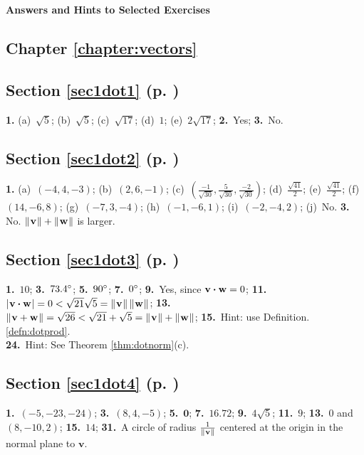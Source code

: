 \textsf{\textbf{\Large Answers and Hints to Selected Exercises}}
\begin{multicols}{2}
\section*{Chapter \ref{chapter:vectors}}
\subsection*{Section \ref{sec1dot1} (p. \pageref{sec1dot1})}
\textbf{1.} 
(a)~$\sqrt{5}$; \quad 
(b)~$\sqrt{5}$; \quad 
(c)~$\sqrt{17}$; \quad 
(d)~$1$;\quad
(e)~$2 \sqrt{17}$; \quad 
\textbf{2.}~Yes; \quad 
\textbf{3.}~No.
\subsection*{Section \ref{sec1dot2} (p. \pageref{sec1dot2})}
\textbf{1.} 
(a)~$(-4,4,-3)$; \quad 
(b)~$(2,6,-1)$;\quad
(c)~$\left ( \frac{-1}{\sqrt{30}},\frac{5}{\sqrt{30}},
\frac{-2}{\sqrt{30}}\right )$; \quad 
(d)~$\frac{\sqrt{41}}{2}$; \quad 
(e)~$\frac{\sqrt{41}}{2}$;\quad
(f)~$(14,-6,8)$; \quad
(g)~$(-7,3,-4)$; \quad
(h)~$(-1,-6,1)$; \quad 
(i)~$(-2,-4,2)$; \quad 
(j)~No.\quad
\textbf{3.} No. $\lVert\mspace{1mu}\textbf{v}\mspace{1mu}\rVert +
\lVert\mspace{1mu}\textbf{w}\mspace{1mu}\rVert$ is larger.

\subsection*{Section \ref{sec1dot3} (p. \pageref{sec1dot3})}
\textbf{1.}~$10$; \quad 
\textbf{3.}~$73.4^\circ$; \quad 
\textbf{5.}~$90^\circ$; \quad 
\textbf{7.}~$0^\circ$;\quad
\textbf{9.}~Yes, since $\textbf{v} \bm{\cdot} \textbf{w} = 0$;
\textbf{11.}~$\lvert\mspace{1mu}\textbf{v} \bm{\cdot} \textbf{w}\mspace{1mu}\rvert =
0 < \sqrt{21}\sqrt{5} = \lVert\mspace{1mu}\textbf{v}\mspace{1mu}\rVert\,\lVert\mspace{1mu}\textbf{w}\mspace{1mu}\rVert$;
\textbf{13.}~$\lVert\mspace{1mu}\textbf{v} + \textbf{w}\mspace{1mu}\rVert = \sqrt{26}
< \sqrt{21} + \sqrt{5} = \lVert\mspace{1mu}\textbf{v}\mspace{1mu}\rVert + \lVert\mspace{1mu}\textbf{w}\mspace{1mu}\rVert$;
\textbf{15.}~Hint: use Definition.
\ref{defn:dotprod}.\\
\textbf{24.}~Hint: See Theorem \ref{thm:dotnorm}(c).

\subsection*{Section \ref{sec1dot4} (p. \pageref{sec1dot4})}
\textbf{1.}~$(-5,-23,-24)$; \quad 
\textbf{3.}~$(8,4,-5)$; \quad 
\textbf{5.}~$\textbf{0}$;
\textbf{7.}~$16.72$; \quad
\textbf{9.}~$4\sqrt{5}$; \quad 
\textbf{11.}~$9$; \quad 
\textbf{13.}~$0$ and $(8,-10,2)$;\quad 
\textbf{15.}~$14$;\quad
\textbf{31.}~A circle of radius $\tfrac1{\lVert\mspace{1mu}\mathbf{v}\mspace{1mu}\rVert}$ centered at the origin in the normal plane to $\mathbf{v}$. 


\end{multicols}
